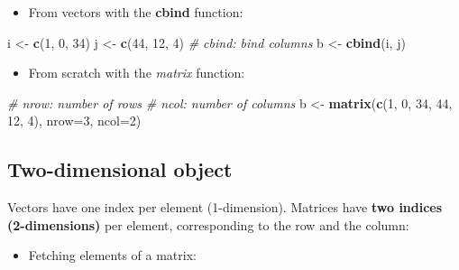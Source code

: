 \documentclass[]{book}
\newenvironment{Shaded}{\begin{snugshade}}{\end{snugshade}}
\newcommand{\CommentTok}[1]{\textcolor[rgb]{0.56,0.35,0.01}{\textit{#1}}}
\newcommand{\DataTypeTok}[1]{\textcolor[rgb]{0.13,0.29,0.53}{#1}}
\newcommand{\DecValTok}[1]{\textcolor[rgb]{0.00,0.00,0.81}{#1}}
\newcommand{\KeywordTok}[1]{\textcolor[rgb]{0.13,0.29,0.53}{\textbf{#1}}}
\newcommand{\NormalTok}[1]{#1}
\newcommand{\StringTok}[1]{\textcolor[rgb]{0.31,0.60,0.02}{#1}}
\providecommand{\tightlist}{%
  \setlength{\itemsep}{0pt}\setlength{\parskip}{0pt}}
\begin{document}
\begin{itemize}
\tightlist
\item
  From vectors with the \textbf{cbind} function:
\end{itemize}

\begin{Shaded}
\begin{Highlighting}[]
\NormalTok{i <-}\StringTok{ }\KeywordTok{c}\NormalTok{(}\DecValTok{1}\NormalTok{, }\DecValTok{0}\NormalTok{, }\DecValTok{34}\NormalTok{)}
\NormalTok{j <-}\StringTok{ }\KeywordTok{c}\NormalTok{(}\DecValTok{44}\NormalTok{, }\DecValTok{12}\NormalTok{, }\DecValTok{4}\NormalTok{)}
\CommentTok{# cbind: bind columns}
\NormalTok{b <-}\StringTok{ }\KeywordTok{cbind}\NormalTok{(i, j)}
\end{Highlighting}
\end{Shaded}

\begin{itemize}
\tightlist
\item
  From scratch with the \emph{matrix} function:
\end{itemize}

\begin{Shaded}
\begin{Highlighting}[]
\CommentTok{# nrow: number of rows}
\CommentTok{# ncol: number of columns}
\NormalTok{b <-}\StringTok{ }\KeywordTok{matrix}\NormalTok{(}\KeywordTok{c}\NormalTok{(}\DecValTok{1}\NormalTok{, }\DecValTok{0}\NormalTok{, }\DecValTok{34}\NormalTok{, }\DecValTok{44}\NormalTok{, }\DecValTok{12}\NormalTok{, }\DecValTok{4}\NormalTok{), }
    \DataTypeTok{nrow=}\DecValTok{3}\NormalTok{,}
    \DataTypeTok{ncol=}\DecValTok{2}\NormalTok{)}
\end{Highlighting}
\end{Shaded}

\hypertarget{two-dimensional-object}{%
\subsection{Two-dimensional object}\label{two-dimensional-object}}

Vectors have one index per element (1-dimension).
Matrices have \textbf{two indices (2-dimensions)} per element, corresponding to the row and the column:

\begin{itemize}
\tightlist
\item
  Fetching elements of a matrix:
\end{itemize}
\end{document}
